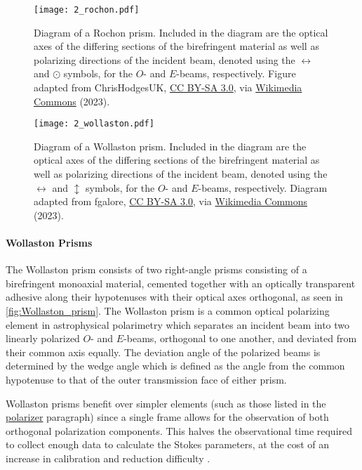 \begin{figure}[t]
    \centering
    \texttt{[image: 2\_rochon.pdf]}
    \caption{Diagram of a Rochon prism. Included in the diagram are the optical axes of the differing sections of the birefringent material as well as polarizing directions of the incident beam, denoted using the $\leftrightarrow$ and $\odot$ symbols, for the $O$- and $E$-beams, respectively. Figure adapted from ChrisHodgesUK, \protect\href{https://creativecommons.org/licenses/by-sa/3.0/}{CC BY-SA 3.0}, via \protect\href{https://commons.wikimedia.org/wiki/File:Rochon_Prism.svg}{Wikimedia Commons} (2023).}
    \label{fig:Rochon_prism}
\end{figure}

\begin{figure}[t]
    \centering
    \texttt{[image: 2\_wollaston.pdf]}
    \caption{Diagram of a Wollaston prism. Included in the diagram are the optical axes of the differing sections of the birefringent material as well as polarizing directions of the incident beam, denoted using the $\leftrightarrow$ and $\updownarrow$ symbols, for the $O$- and $E$-beams, respectively. Diagram adapted from fgalore, \protect\href{https://creativecommons.org/licenses/by-sa/3.0/}{CC BY-SA 3.0}, via \protect\href{https://commons.wikimedia.org/wiki/File:Wollaston-prism.svg}{Wikimedia Commons} (2023).}
    \label{fig:Wollaston_prism}
\end{figure}

\paragraph{Wollaston Prisms}
The Wollaston prism consists of two right-angle prisms consisting of a birefringent monoaxial material, cemented together with an optically transparent adhesive along their hypotenuses with their optical axes orthogonal, as seen in \autoref{fig:Wollaston_prism}. The Wollaston prism is a common optical polarizing element in astrophysical polarimetry which separates an incident beam into two linearly polarized $O$- and $E$-beams, orthogonal to one another, and deviated from their common axis equally. The deviation angle of the polarized beams is determined by the wedge angle which is defined as the angle from the common hypotenuse to that of the outer transmission face of either prism.

Wollaston prisms benefit over simpler elements (such as those listed in the \hyperref[par:polarizer]{polarizer} paragraph) since a single frame allows for the observation of both orthogonal polarization components. This halves the observational time required to collect enough data to calculate the Stokes parameters, at the cost of an increase in calibration and reduction difficulty \citep{wollaston}.

